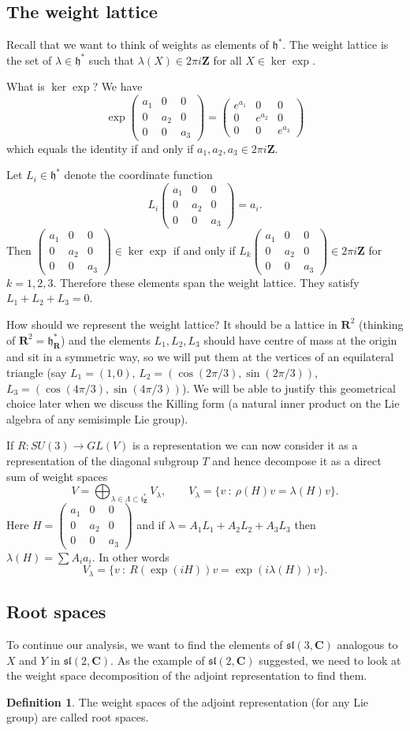 \documentclass[12pt]{article}
\newcommand{\CC}{\mathbf{C}}
\newcommand{\RR}{\mathbf{R}}
\newcommand{\ZZ}{\mathbf{Z}}
\newcommand{\Diag}[3]{\left(\begin{array}{ccc}#1 & 0 & 0\\0 & #2 & 0\\0 & 0 & #3\end{array}\right)}
\theoremstyle{definition}
\newtheorem{dfn}[thm]{Definition}
\theoremstyle{check}
\theoremstyle{remark}
\theoremstyle{TheoremNum}
\begin{document}
\subsection{The weight lattice}

Recall that we want to think of weights as elements of $\mathfrak{h}^*$. The weight lattice is the set of $\lambda\in\mathfrak{h}^*$ such that $\lambda(X)\in 2\pi i\ZZ$ for all $X\in\ker\exp$.

What is $\ker\exp$? We have
\[\exp\Diag{a_1}{a_2}{a_3}=\Diag{e^{a_1}}{e^{a_2}}{e^{a_3}}\]
which equals the identity if and only if $a_1,a_2,a_3\in 2\pi i\ZZ$.

Let $L_i\in\mathfrak{h}^*$ denote the coordinate function
\[L_i\Diag{a_1}{a_2}{a_3}=a_i.\]
Then $\Diag{a_1}{a_2}{a_3}\in\ker\exp$ if and only if $L_k\Diag{a_1}{a_2}{a_3}\in 2\pi i\ZZ$ for $k=1,2,3$. Therefore these elements span the weight lattice. They satisfy $L_1+L_2+L_3=0$.

How should we represent the weight lattice? It should be a lattice in $\RR^2$ (thinking of $\RR^2=\mathfrak{h}^*_{\RR}$) and the elements $L_1,L_2,L_3$ should have centre of mass at the origin and sit in a symmetric way, so we will put them at the vertices of an equilateral triangle (say $L_1=(1,0)$, $L_2=(\cos(2\pi/3),\sin(2\pi/3))$, $L_3=(\cos(4\pi/3),\sin(4\pi/3))$). We will be able to justify this geometrical choice later when we discuss the Killing form (a natural inner product on the Lie algebra of any semisimple Lie group).

If $R\colon SU(3)\to GL(V)$ is a representation we can now consider it as a representation of the diagonal subgroup $T$ and hence decompose it as a direct sum of weight spaces
\[V=\bigoplus_{\lambda\in\Lambda\subset\mathfrak{t}^*_{\ZZ}}V_{\lambda},\qquad V_{\lambda}=\{v\ :\ \rho(H)v=\lambda(H)v\}.\]
Here $H=\Diag{a_1}{a_2}{a_3}$ and if $\lambda=A_1L_1+A_2L_2+A_3L_3$ then $\lambda(H)=\sum A_ia_i$. In other words
\[V_{\lambda}=\{v\ :\ R(\exp(iH))v=\exp(i\lambda(H))v\}.\]

\subsection{Root spaces}

To continue our analysis, we want to find the elements of $\mathfrak{sl}(3,\CC)$ analogous to $X$ and $Y$ in $\mathfrak{sl}(2,\CC)$. As the example of $\mathfrak{sl}(2,\CC)$ suggested, we need to look at the weight space decomposition of the adjoint representation to find them.
\begin{dfn}
The weight spaces of the adjoint representation (for any Lie group) are called root spaces.
\end{dfn}
\end{document}
